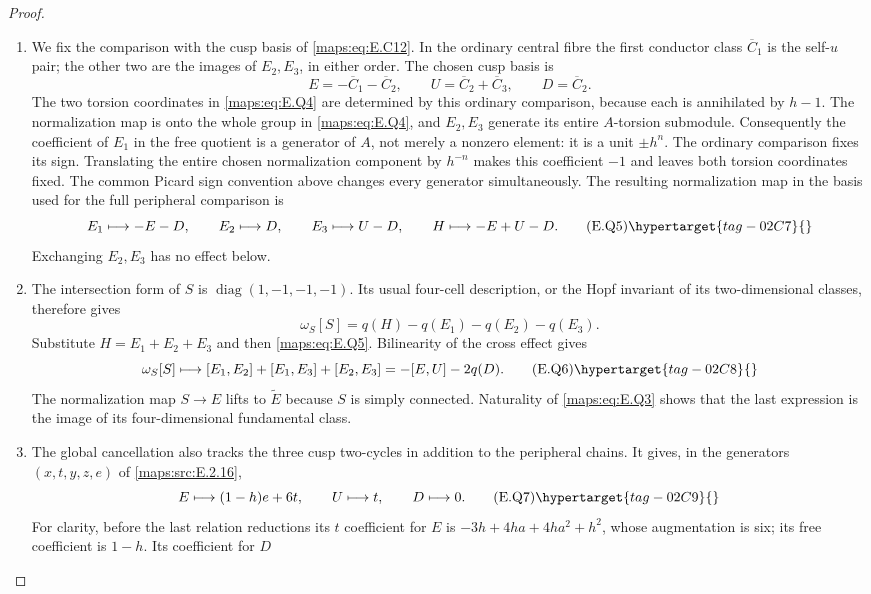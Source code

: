\begin{proof}
\begin{enumerate}[label={$\langle1\rangle$\arabic*.},leftmargin=*]
\item We fix the comparison with the cusp basis of \eqref{maps:eq:E.C12}.  In the ordinary
central fibre the first conductor class $\overline C_1$ is the
self-$u$ pair; the other two are the images of $E_2,E_3$,
in either order.  The chosen cusp basis is
\[
 E=-\overline C_1-\overline C_2,\qquad
 U=\overline C_2+\overline C_3,\qquad D=\overline C_2.
\]
The two torsion coordinates in \eqref{maps:eq:E.Q4} are determined by
this ordinary comparison, because each is annihilated by
$h-1$.  The normalization map is onto the whole group in
\eqref{maps:eq:E.Q4}, and $E_2,E_3$ generate its entire $A$-torsion
submodule.  Consequently the coefficient of $E_1$ in the
free quotient is a generator of $A$, not merely a nonzero
element: it is a unit $\pm h^n$.  The ordinary comparison
fixes its sign.  Translating the entire chosen normalization
component by $h^{-n}$ makes this coefficient $-1$ and leaves
both torsion coordinates fixed.  The common Picard sign
convention above changes every generator simultaneously.
The resulting
normalization map in the basis used for the full peripheral
comparison is
\[
 E_1\longmapsto-E-D,\qquad
 E_2\longmapsto D,\qquad E_3\longmapsto U-D,
 \qquad H\longmapsto-E+U-D.
 \tag{E.Q5}\hypertarget{tag-02C7}{}\label{maps:eq:E.Q5}
\]
Exchanging $E_2,E_3$ has no effect below.  \item The intersection form of $S$ is
$\operatorname{diag}(1,-1,-1,-1)$.  Its usual four-cell
description, or the Hopf invariant of its two-dimensional
classes, therefore gives
\[
 \omega_S[S]=q(H)-q(E_1)-q(E_2)-q(E_3).
\]
Substitute $H=E_1+E_2+E_3$ and then \eqref{maps:eq:E.Q5}.  Bilinearity
of the cross effect gives
\[
 \omega_S[S]\longmapsto
 [E_1,E_2]+[E_1,E_3]+[E_2,E_3]
                      =-[E,U]-2q(D).
 \tag{E.Q6}\hypertarget{tag-02C8}{}\label{maps:eq:E.Q6}
\]
The normalization map $S\to E$ lifts to $\widetilde E$
because $S$ is simply connected.  Naturality of \eqref{maps:eq:E.Q3}
shows that the last expression is the image of its four-dimensional fundamental class.  \item The global cancellation also tracks the three cusp two-cycles in addition to the peripheral chains.  It gives, in the generators $(x,t,y,z,e)$ of
\ref{maps:src:E.2.16},
\[
 E\longmapsto(1-h)e+6t,\qquad
 U\longmapsto t,\qquad D\longmapsto0.
 \tag{E.Q7}\hypertarget{tag-02C9}{}\label{maps:eq:E.Q7}
\]
For clarity, before the last relation reductions its
$t$ coefficient for $E$ is
$-3h+4ha+4ha^2+h^2$, whose augmentation is six;
its free coefficient is $1-h$.  Its coefficient for $D$

\end{enumerate}
\end{proof}
